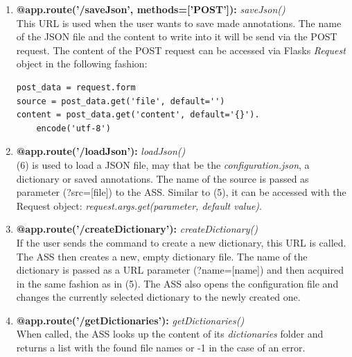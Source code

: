 \begin{enumerate}[(1) -]
	\item \textbf{@app.route('/saveJson', methods=['POST']):} \emph{saveJson()}\\
	This URL is used when the user wants to save made annotations. The name of the JSON file and the content to write into it will be send via the POST request. The content of the POST request can be accessed via Flasks \emph{Request} object\cite{web:flask} in the following fashion:
	\begin{lstlisting}[frame=single]
post_data = request.form
source = post_data.get('file', default='')
content = post_data.get('content', default='{}').
	encode('utf-8')
	\end{lstlisting}
	
	\item \textbf{@app.route('/loadJson'):} \emph{loadJson()}\\
	(6) is used to load a JSON file, may that be the \emph{configuration.json}, a dictionary or saved annotations. The name of the source is passed as parameter (?src=[file]) to the ASS. Similar to (5), it can be accessed with the Request object\cite{web:flask}: \emph{request.args.get(parameter, default value)}.
	
	\item \textbf{@app.route('/createDictionary'):} \emph{createDictionary()}\\
	If the user sends the command to create a new dictionary, this URL is called. The ASS then creates a new, empty dictionary file. The name of the dictionary is passed as a URL parameter (?name=[name]) and then acquired in the same fashion as in (5). The ASS also opens the configuration file and changes the currently selected dictionary to the newly created one.
	
	\item \textbf{@app.route('/getDictionaries'):} \emph{getDictionaries()}\\
	When called, the ASS looks up the content of its \emph{dictionaries} folder and returns a list with the found file names or -1 in the case of an error.
\end{enumerate}